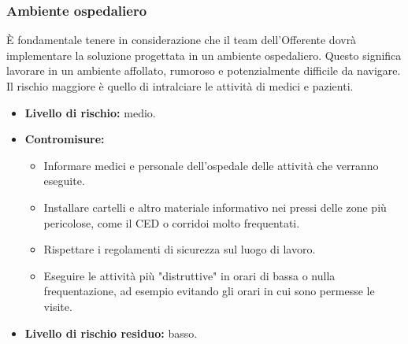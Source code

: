                 
                \subsubsection{Ambiente ospedaliero}
                	È fondamentale tenere in considerazione che il team dell'Offerente dovrà implementare la soluzione progettata in un ambiente ospedaliero. Questo significa lavorare in un ambiente affollato, rumoroso e potenzialmente difficile da navigare. Il rischio maggiore è quello di intralciare le attività di medici e pazienti.
                    \begin{itemize}
                    	\item \textbf{Livello di rischio:} medio.
                        \item \textbf{Contromisure:} 
                        \begin{itemize}
                        	\item Informare medici e personale dell'ospedale delle attività che verranno eseguite.
                            \item Installare cartelli e altro materiale informativo nei pressi delle zone più pericolose, come il CED o corridoi molto frequentati.
                            \item Rispettare i regolamenti di sicurezza sul luogo di lavoro.
                            \item Eseguire le attività più "distruttive" in orari di bassa o nulla frequentazione, ad esempio evitando gli orari in cui sono permesse le visite.
                        \end{itemize}
                        \item \textbf{Livello di rischio residuo:} basso.
                    \end{itemize}
                    
